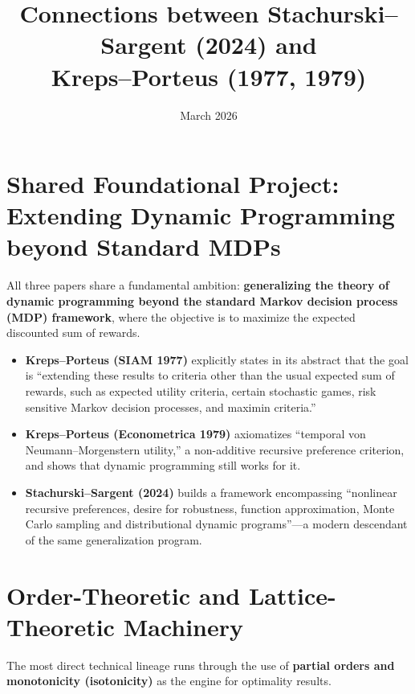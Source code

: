 \documentclass[12pt]{article}
\title{Connections between Stachurski--Sargent (2024) and\\
Kreps--Porteus (1977, 1979)}
\author{}
\date{March 2026}
\begin{document}
\maketitle

\section{Shared Foundational Project: Extending Dynamic Programming beyond Standard MDPs}

All three papers share a fundamental ambition: \textbf{generalizing the theory of dynamic programming beyond the standard Markov decision process (MDP) framework}, where the objective is to maximize the expected discounted sum of rewards.

\begin{itemize}
\item \textbf{Kreps--Porteus (SIAM 1977)} explicitly states in its abstract that the goal is ``extending these results to criteria other than the usual expected sum of rewards, such as expected utility criteria, certain stochastic games, risk sensitive Markov decision processes, and maximin criteria.''

\item \textbf{Kreps--Porteus (Econometrica 1979)} axiomatizes ``temporal von Neumann--Morgenstern utility,'' a non-additive recursive preference criterion, and shows that dynamic programming still works for it.

\item \textbf{Stachurski--Sargent (2024)} builds a framework encompassing ``nonlinear recursive preferences, desire for robustness, function approximation, Monte Carlo sampling and distributional dynamic programs''---a modern descendant of the same generalization program.
\end{itemize}


\section{Order-Theoretic and Lattice-Theoretic Machinery}

The most direct technical lineage runs through the use of \textbf{partial orders and monotonicity (isotonicity)} as the engine for optimality results.
\end{document}
